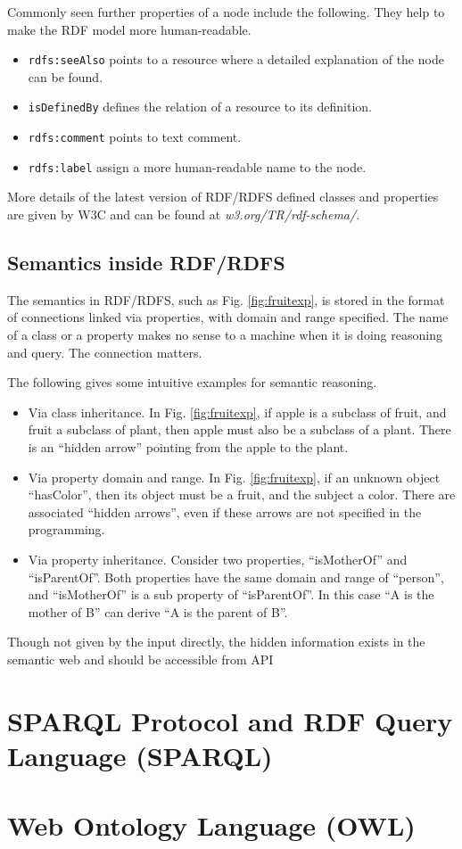 Commonly seen further properties of a node include the following. They help to make the RDF model more human-readable.
\begin{itemize}
	\item \verb|rdfs:seeAlso| points to a resource where a detailed explanation of the node can be found.
	\item \verb|isDefinedBy| defines the relation of a resource to its definition.
	\item \verb|rdfs:comment| points to text comment.
	\item \verb|rdfs:label| assign a more human-readable name to the node.
\end{itemize}

More details of the latest version of RDF/RDFS defined classes and properties are given by W3C and can be found at \textit{w3.org/TR/rdf-schema/}.

\subsection{Semantics inside RDF/RDFS}

The semantics in RDF/RDFS, such as Fig. \ref{fig:fruitexp}, is stored in the format of connections linked via properties, with domain and range specified. The name of a class or a property makes no sense to a machine when it is doing reasoning and query. The connection matters. 

The following gives some intuitive examples for semantic reasoning.
\begin{itemize}
	\item Via class inheritance. In Fig. \ref{fig:fruitexp}, if apple is a subclass of fruit, and fruit a subclass of plant, then apple must also be a subclass of a plant. There is an ``hidden arrow'' pointing from the apple to the plant.
	\item Via property domain and range. In Fig. \ref{fig:fruitexp}, if an unknown object ``hasColor'', then its object must be a fruit, and the subject a color. There are associated ``hidden arrows'', even if these arrows are not specified in the programming. 
	\item Via property inheritance. Consider two properties, ``isMotherOf'' and ``isParentOf''. Both properties have the same domain and range of ``person'', and ``isMotherOf'' is a sub property of ``isParentOf''. In this case ``A is the mother of B'' can derive ``A is the parent of B''. 
\end{itemize}

Though not given by the input directly, the hidden information exists in the semantic web and should be accessible from API

\section{SPARQL Protocol and RDF Query Language (SPARQL)}

\section{Web Ontology Language (OWL)}
